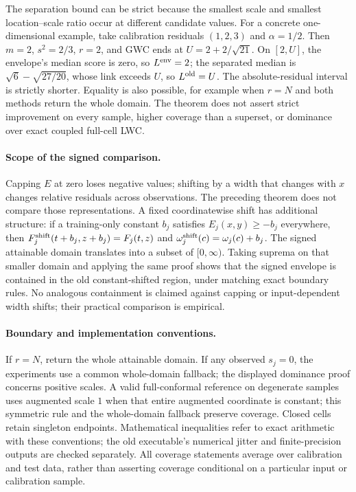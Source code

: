 The separation bound can be strict because the smallest scale and smallest
location--scale ratio occur at different candidate values. For a concrete
one-dimensional example, take calibration residuals $(1,2,3)$ and
$\alpha=1/2$. Then $m=2$, $s^2=2/3$, $r=2$, and GWC ends at
$U=2+2/\sqrt{21}$. On $[2,U]$, the envelope's median score is zero,
so $L^{\rm env}=2$; the separated median is
$\sqrt6-\sqrt{27/20}$, whose link exceeds $U$, so $L^{\rm old}=U$.
The absolute-residual interval is strictly shorter. Equality is also
possible, for example when $r=N$ and both methods return the whole domain.
The theorem does not assert strict improvement on every sample, higher
coverage than a superset, or dominance over exact coupled full-cell LWC.

\paragraph{Scope of the signed comparison.}
Capping $E$ at zero loses negative values; shifting by a width that changes
with $x$ changes relative residuals across observations. The preceding theorem
does not compare those representations. A fixed coordinatewise shift has
additional structure: if a training-only constant $b_j$ satisfies
$E_j(x,y)\ge-b_j$ everywhere, then
$F_j^{\rm shift}(t+b_j,z+b_j)=F_j(t,z)$ and
$\omega_j^{\rm shift}(c)=\omega_j(c)+b_j$.
The signed attainable domain translates into a subset of $[0,\infty)$.
Taking suprema on that smaller domain and applying the same proof shows that
the signed envelope is contained in the old constant-shifted region, under
matching exact boundary rules. No analogous containment is claimed against
capping or input-dependent width shifts; their practical comparison is empirical.

\paragraph{Boundary and implementation conventions.}
If $r=N$, return the whole attainable domain. If any observed $s_j=0$, the
experiments use a common whole-domain fallback; the displayed dominance proof
concerns positive scales. A valid full-conformal reference on degenerate
samples uses augmented scale $1$ when that entire augmented coordinate is
constant; this symmetric rule and the whole-domain fallback preserve coverage.
Closed cells retain singleton endpoints. Mathematical inequalities refer to
exact arithmetic with these conventions; the old executable's numerical
jitter and finite-precision outputs are checked separately. All coverage
statements average over calibration and test data, rather than asserting
coverage conditional on a particular input or calibration sample.
